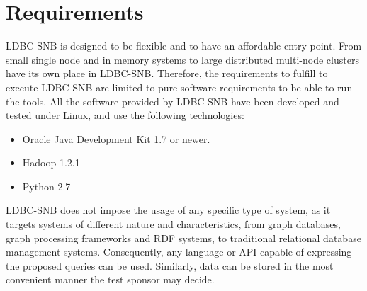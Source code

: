 

\section{Requirements}

LDBC-SNB is designed to be flexible and to have an affordable entry point.
From small single node and in memory systems to large distributed multi-node
clusters have its own place in LDBC-SNB.  Therefore, the requirements to
fulfill to execute LDBC-SNB are limited to pure software requirements to be
able to run the tools. All the software provided by LDBC-SNB have been
developed and tested under Linux, and use the following technologies:

\begin{itemize}
    \item Oracle Java Development Kit 1.7 or newer.
    \item Hadoop 1.2.1
    \item Python 2.7
\end{itemize}

LDBC-SNB does not impose the usage of any specific type of system, as it
targets systems of different nature and characteristics, from graph databases,
graph processing frameworks and RDF systems, to traditional relational database
management systems. Consequently, any language or API capable of expressing the
proposed queries can be used. Similarly, data can be stored in the most
convenient manner the test sponsor may decide.




%
%
%
%




